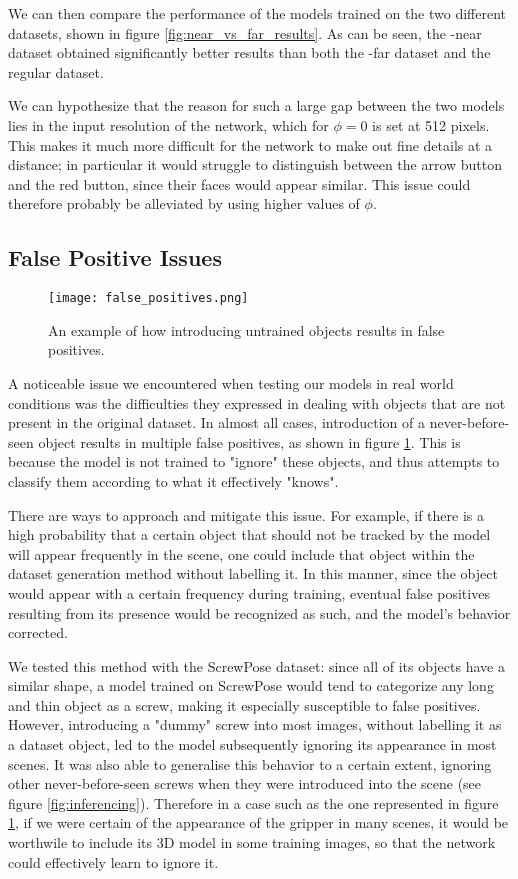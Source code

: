 We can then compare the performance of the models trained on the two different datasets, shown in figure \ref{fig:near_vs_far_results}. As can be seen, the -near dataset obtained significantly better results than both the -far dataset and the regular dataset.

We can hypothesize that the reason for such a large gap between the two models lies in the input resolution of the network, which for $\phi = 0$ is set at 512 pixels. This makes it much more difficult for the network to make out fine details at a distance; in particular it would struggle to distinguish between the arrow button and the red button, since their faces would appear similar. This issue could therefore probably be alleviated by using higher values of $\phi$.

\subsection{False Positive Issues}
\label{false_positives_issue}

\begin{figure}[ht]
    \texttt{[image: false\_positives.png]}
    \caption{An example of how introducing untrained objects results in false positives.}
    \label{false_positives}
\end{figure}

A noticeable issue we encountered when testing our models in real world conditions was the difficulties they expressed in dealing with objects that are not present in the original dataset. In almost all cases, introduction of a never-before-seen object results in multiple false positives, as shown in figure \ref{false_positives}. This is because the model is not trained to "ignore" these objects, and thus attempts to classify them according to what it effectively "knows".

There are ways to approach and mitigate this issue. For example, if there is a high probability that a certain object that should not be tracked by the model will appear frequently in the scene, one could include that object within the dataset generation method without labelling it. In this manner, since the object would appear with a certain frequency during training, eventual false positives resulting from its presence would be recognized as such, and the model's behavior corrected.

We tested this method with the ScrewPose dataset: since all of its objects have a similar shape, a model trained on ScrewPose would tend to categorize any long and thin object as a screw, making it especially susceptible to false positives. However, introducing a "dummy" screw into most images, without labelling it as a dataset object, led to the model subsequently ignoring its appearance in most scenes. It was also able to generalise this behavior to a certain extent, ignoring other never-before-seen screws when they were introduced into the scene (see figure \ref{fig:inferencing}). Therefore in a case such as the one represented in figure \ref{false_positives}, if we were certain of the appearance of the gripper in many scenes, it would be worthwile to include its 3D model in some training images, so that the network could effectively learn to ignore it.

